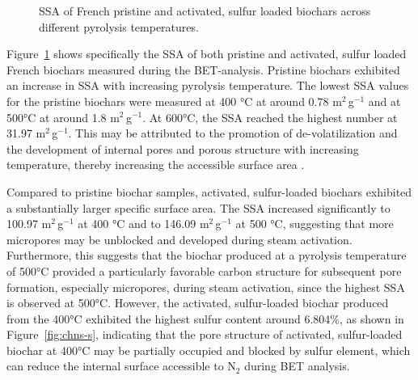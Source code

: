 \begin{figure}[htbp]
\centering
{}
\caption{SSA of French pristine and activated, sulfur loaded biochars across different pyrolysis temperatures.}
\label{fig:bet_surface_area}
\end{figure}

Figure~\ref{fig:bet_surface_area} shows specifically the SSA of both pristine and activated, sulfur loaded French biochars measured during the BET-analysis. Pristine biochars exhibited an increase in SSA with increasing pyrolysis temperature. The lowest SSA values for the pristine biochars were measured at 400 °C at around 0.78 m$^2$\,g$^{-1}$ and at 500°C at around 1.8 m$^2$\,g$^{-1}$. At 600°C, the SSA reached the highest number at 31.97 m$^2$\,g$^{-1}$. This may be attributed to the promotion of de-volatilization and the development of internal pores and porous structure with increasing temperature, thereby increasing the accessible surface area \parencite{tomczyk-2020,ghorbani-2022}.

\vspace{0.3em}

Compared to pristine biochar samples, activated, sulfur-loaded biochars exhibited a substantially larger specific surface area. The SSA increased significantly to 100.97 m$^2$\,g$^{-1}$ at 400 °C and to 146.09 m$^2$\,g$^{-1}$ at 500 °C, suggesting that more micropores may be unblocked and developed during steam activation. Furthermore, this suggests that the biochar produced at a pyrolysis temperature of 500°C provided a particularly favorable carbon structure for subsequent pore formation, especially micropores, during steam activation, since the highest SSA is observed at 500°C. However, the activated, sulfur-loaded biochar produced from the 400°C exhibited the highest sulfur content around 6.804\%, as shown in Figure~\ref{fig:chns-s}, indicating that the pore structure of activated, sulfur-loaded biochar at 400°C may be partially occupied and blocked by sulfur element, which can reduce the internal surface accessible to N$_2$ during BET analysis. 

